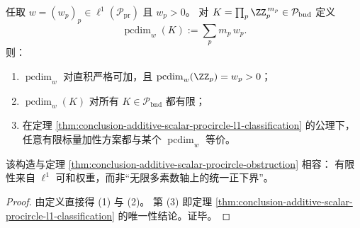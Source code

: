 \begin{corollary}[可和权重的有限标量替代与可组合性]\label{cor:conclusion-additive-scalar-procircle-weighted-model}
任取 \(w=(w_p)_p\in\ell^1(\mathcal P_{\mathrm{pr}})\) 且 \(w_p>0\)。
对
\(
K=\prod_p\ZZ_p^{\,m_p}\in\mathcal P_{\mathrm{bnd}}
\)
定义
\[
\operatorname{pcdim}_w(K):=\sum_p m_p\,w_p.
\]
则：
\begin{enumerate}
  \item \(\operatorname{pcdim}_w\) 对直积严格可加，且 \(\operatorname{pcdim}_w(\ZZ_p)=w_p>0\)；
  \item \(\operatorname{pcdim}_w(K)\) 对所有 \(K\in\mathcal P_{\mathrm{bnd}}\) 都有限；
  \item 在定理 \ref{thm:conclusion-additive-scalar-procircle-l1-classification} 的公理下，任意有限标量加性方案都与某个 \(\operatorname{pcdim}_w\) 等价。
\end{enumerate}
该构造与定理 \ref{thm:conclusion-additive-scalar-procircle-obstruction} 相容：
有限性来自 \(\ell^1\) 可和权重，而非“无限多素数轴上的统一正下界”。
\end{corollary}
\begin{proof}
由定义直接得 (1) 与 (2)。
第 (3) 即定理 \ref{thm:conclusion-additive-scalar-procircle-l1-classification} 的唯一性结论。证毕。
\end{proof}
